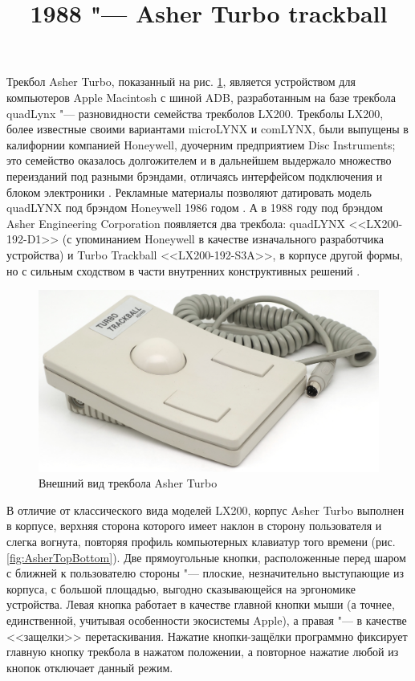 \documentclass[11pt, a4paper]{article}
\begin{document}
\title{1988 "--- Asher Turbo trackball}
\date{}
\maketitle
{}
Трекбол Asher Turbo, показанный на рис. \ref{fig:AsherPic}, является устройством для компьютеров Apple Macintosh с шиной ADB, разработанным на базе трекбола quadLynx "--- разновидности семейства трекболов LX200. Трекболы LX200, более известные своими вариантами microLYNX и comLYNX, были выпущены в калифорнии компанией Honeywell, дуочерним предприятием Disc Instruments; это семейство оказалось долгожителем и в дальнейшем выдержало множество переизданий под разными брэндами, отличаясь интерфейсом подключения и блоком электроники \cite{lx200}. Рекламные материалы позволяют датировать модель quadLYNX под брэндом Honeywell 1986 годом \cite{honeywell}. А в 1988 году под брэндом Asher Engineering Corporation появляется два трекбола: quadLYNX <<LX200-192-D1>> (с упоминанием Honeywell в качестве изначального разработчика устройства) \cite{asher} и Turbo Trackball <<LX200-192-S3A>>, в корпусе другой формы, но с сильным сходством в части внутренних конструктивных решений \cite{turbo}.

\begin{figure}[h]
    \centering
    \includegraphics[scale=0.58]{1988_asher_turbo_trackball/pic_60.jpg}
    \caption{Внешний вид трекбола Asher Turbo}
    \label{fig:AsherPic}
\end{figure}

В отличие от классического вида моделей LX200, корпус Asher Turbo выполнен в корпусе, верхняя сторона которого имеет наклон в сторону пользователя и слегка вогнута, повторяя профиль компьютерных клавиатур того времени (рис. \ref{fig:AsherTopBottom}). Две прямоугольные кнопки, расположенные перед шаром с ближней к пользователю стороны "--- плоские, незначительно выступающие из корпуса, с большой площадью, выгодно сказывающейся на эргономике устройства. Левая кнопка работает в качестве главной кнопки мыши (а точнее, единственной, учитывая особенности экосистемы Apple), а правая "--- в качестве <<защелки>> перетаскивания. Нажатие кнопки-защёлки программно фиксирует главную кнопку трекбола в нажатом положении, а повторное нажатие любой из кнопок отключает данный режим.
\end{document}
